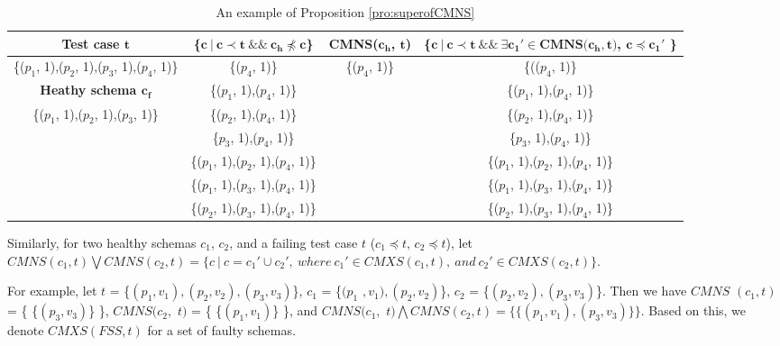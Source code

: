 \documentclass{sig-alternate-05-2015}
\begin{document}
{{%
\begin{table}[ht]
  \centering
  \setlength{\tabcolsep}{3pt}
  \caption{An example of Proposition \ref{pro:superofCMNS}}
    \begin{tabular}{|c|c|c|c|}
    \hline
  \textbf{  Test case $\textbf{t}$} & \textbf{ \{$\textbf{c}\ |\ \textbf{c} \prec \textbf{t}\ \&\&\ \textbf{c}_{\textbf{h}} \npreceq \textbf{c}$\} }& \textbf{ CMNS($\textbf{c}_{\textbf{h}}$, $\textbf{t}$)} & \textbf{\{$ \textbf{c}\ |\ \textbf{c} \prec \textbf{t} \ \&\& \ \exists \textbf{c}_{\textbf{1}}' \in \textbf{CMNS}\textbf{(}\textbf{c}_{\textbf{h}}, \textbf{t}\textbf{)}$, $\textbf{c} \preceq \textbf{c}_{\textbf{1}}'$ \}}\\\hline
    \{($p_{1}$, 1),($p_{2}$, 1),($p_{3}$, 1),($p_{4}$, 1)\}  & \{($p_{4}$, 1)\} & \{($p_{4}$, 1)\} & \{(($p_{4}$, 1)\}\\ \cline{1-1}
      \textbf{Heathy schema $\textbf{c}_{\textbf{f}}$}  & \{($p_{1}$, 1),($p_{4}$, 1)\} &  & \{($p_{1}$, 1),($p_{4}$, 1)\} \\\cline{1-1}
     \{($p_{1}$, 1),($p_{2}$, 1),($p_{3}$, 1)\}         &\{($p_{2}$, 1),($p_{4}$, 1)\}  &  & \{($p_{2}$, 1),($p_{4}$, 1)\}  \\
                         &\{$p_{3}$, 1),($p_{4}$, 1)\}   &  & \{$p_{3}$, 1),($p_{4}$, 1)\}  \\
                         &\{($p_{1}$, 1),($p_{2}$, 1),($p_{4}$, 1)\}   &  & \{($p_{1}$, 1),($p_{2}$, 1),($p_{4}$, 1)\}  \\
                         &\{($p_{1}$, 1),($p_{3}$, 1),($p_{4}$, 1)\}  &  & \{($p_{1}$, 1),($p_{3}$, 1),($p_{4}$, 1)\}  \\
                         &\{($p_{2}$, 1),($p_{3}$, 1),($p_{4}$, 1)\}  &  & \{($p_{2}$, 1),($p_{3}$, 1),($p_{4}$, 1)\}  \\ \hline
    \end{tabular}%
  \label{examleOfCMNSPro}%
\end{table}%


Similarly, for two healthy schemas $c_{1}$, $c_{2}$, and a failing test case $t$ ($c_{1} \preceq t$, $c_{2} \preceq t$), let $CMNS(c_{1}, t) \bigvee CMNS(c_{2}, t)  = \{ c\ |\ c = c_{1}' \cup c_{2}',\ where\ c_{1}' \in CMXS(c_{1}, t),\ and\ c_{2}' \in CMXS(c_{2}, t) \}$.

For example, let $t$ = \{$(p_{1},v_{1}), (p_{2}, v_{2}), (p_{3}, v_{3})$\}, $c_{1}$ = \{$(p_{1}$ $, v_{1}), (p_{2}, v_{2})$\}, $c_{2}$ = \{$(p_{2}, v_{2}), (p_{3}, v_{3})$\}. Then we have $CMNS$ $(c_{1}, t)$ = \{ \{$(p_{3}, v_{3})$\} \}, $CMNS(c_{2},$ $ t)$ = \{ \{$(p_{1}, v_{1})$\} \}, and  $CMNS(c_{1},$ $ t) \bigwedge CMNS(c_{2}, t) = \{ \{(p_{1}, v_{1}), (p_{3}, v_{3})\} \} $. Based on this, we denote $CMXS(FSS,t)$ for a set of faulty schemas.

}}
\end{document}
